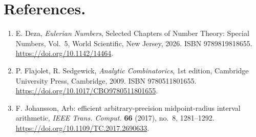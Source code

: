 \documentclass[11pt,a4paper]{article}
\begin{document}
\section*{References.}
\begin{enumerate}\setlength{\itemsep}{1pt}
\item[{[1]}] E. Deza, \emph{Eulerian Numbers}, Selected Chapters of Number Theory: Special Numbers, Vol.~5, World Scientific, New Jersey, 2026. ISBN 9789819818655. \url{https://doi.org/10.1142/14464}.
\item[{[2]}] P. Flajolet, R. Sedgewick, \emph{Analytic Combinatorics}, 1st edition, Cambridge University Press, Cambridge, 2009. ISBN 9780511801655. \url{https://doi.org/10.1017/CBO9780511801655}.
\item[{[3]}] F. Johansson, Arb: efficient arbitrary-precision midpoint-radius interval arithmetic, \emph{IEEE Trans. Comput.} \textbf{66} (2017), no.~8, 1281--1292. \url{https://doi.org/10.1109/TC.2017.2690633}.
\end{enumerate}
\end{document}
